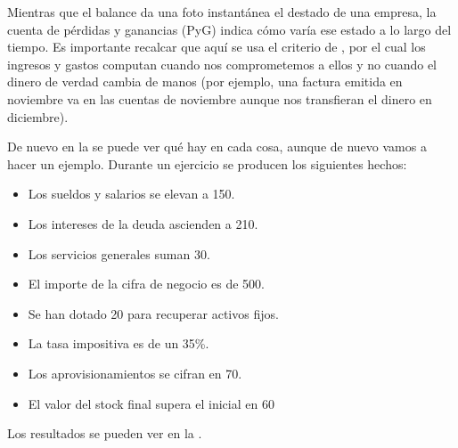 \documentclass[nochap,palatino,shortheader]{apuntes}
\begin{document}
Mientras que el balance da una foto instantánea el destado de una empresa, la cuenta de pérdidas y ganancias (PyG) indica cómo varía ese estado a lo largo del tiempo. Es importante recalcar que aquí se usa el criterio de , por el cual los ingresos y gastos computan cuando nos comprometemos a ellos y no cuando el dinero de verdad cambia de manos (por ejemplo, una factura emitida en noviembre va en las cuentas de noviembre aunque nos transfieran el dinero en diciembre).

De nuevo en la  se puede ver qué hay en cada cosa, aunque de nuevo vamos a hacer un ejemplo. Durante un ejercicio se producen los siguientes hechos:

\begin{itemize}
\item Los sueldos y salarios se elevan a 150.
\item Los intereses de la deuda ascienden a 210.
\item Los servicios generales suman 30.
\item El importe de la cifra de negocio es de 500.
\item Se han dotado 20 para recuperar activos fijos.
\item La tasa impositiva es de un 35\%.
\item Los aprovisionamientos se cifran en 70.
\item El valor del stock final supera el inicial en 60
\end{itemize}

Los resultados se pueden ver en la .
\end{document}
